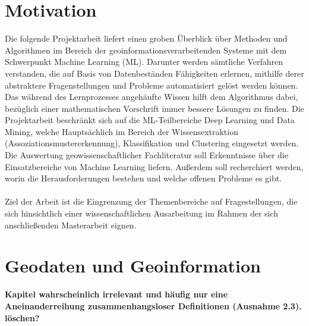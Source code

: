 \documentclass[11pt,ceqn]{book}
\begin{document}
\chapter{Motivation}
Die folgende Projektarbeit liefert einen groben Überblick über Methoden und Algorithmen im Bereich der geoinformationsverarbeitenden Systeme mit dem Schwerpunkt Machine Learning (ML). Darunter werden sämtliche Verfahren verstanden, die auf Basis von Datenbeständen  Fähigkeiten erlernen, mithilfe derer abstraktere Fragenstellungen und Probleme automatisiert gelöst werden können. Das während des Lernprozesses angehäufte Wissen hilft dem Algorithmus dabei, bezüglich einer mathematischen Vorschrift immer bessere Lösungen zu finden. Die Projektarbeit beschränkt sich auf die ML-Teilbereiche Deep Learning und Data Mining, welche Hauptsächlich im Bereich der Wissensextraktion (Assoziationsmustererkennung), Klassifikation und Clustering eingesetzt werden. Die Auswertung geowissenschaftlicher Fachliteratur soll Erkenntnisse über die Einsatzbereiche von Machine Learning liefern. Außerdem soll recherchiert werden, worin die Herausforderungen bestehen und welche offenen Probleme es gibt.
\\~\\
Ziel der Arbeit ist die Eingrenzung der Themenbereiche auf Fragestellungen, die sich hinsichtlich einer wissenschaftlichen Ausarbeitung im Rahmen der sich anschließenden Masterarbeit eignen.

\chapter{Geodaten und Geoinformation}

\textbf{Kapitel wahrscheinlich irrelevant und häufig nur eine Aneinanderreihung zusammenhangsloser Definitionen (Ausnahme 2.3). löschen?}
\end{document}
